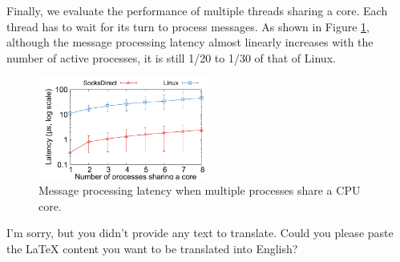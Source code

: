 

Finally, we evaluate the performance of multiple threads sharing a core. Each thread has to wait for its turn to process messages.
As shown in Figure \ref {socksdirect:fig:eval-context-switch}, although the message processing latency almost linearly increases with the number of active processes, it is still 1/20 to 1/30 of that of Linux.


\begin{figure}[htbp]
	
	\centering \includegraphics[width=0.5\textwidth]{eval/microbenchmark/sharecore-lat.pdf}
	
	\caption{Message processing latency when multiple processes share a CPU core.}
	\label{socksdirect:fig:eval-context-switch}
\end{figure}



I'm sorry, but you didn't provide any text to translate. Could you please paste the LaTeX content you want to be translated into English?

